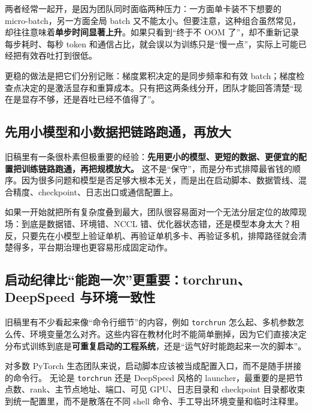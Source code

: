 两者经常一起开，是因为团队同时面临两种压力：一方面单卡装不下想要的 micro-batch，另一方面全局 batch 又不能太小。但要注意，这种组合虽然常见，却往往意味着\textbf{单步时间显著上升}。如果只看到“终于不 OOM 了”，却不重新记录每步耗时、每秒 token 和通信占比，就会误以为训练只是“慢一点”，实际上可能已经把有效吞吐打到很低。

更稳的做法是把它们分别记账：梯度累积决定的是同步频率和有效 batch；梯度检查点决定的是激活显存和重算成本。只有把这两条线分开，团队才能回答清楚“现在是显存不够，还是吞吐已经不值得了”。

\subsection{先用小模型和小数据把链路跑通，再放大}
旧稿里有一条很朴素但极重要的经验：\textbf{先用更小的模型、更短的数据、更便宜的配置把训练链路跑通，再把规模放大。} 这不是“保守”，而是分布式排障最省钱的顺序。因为很多问题和模型是否足够大根本无关，而是出在启动脚本、数据管线、混合精度、checkpoint、日志出口或通信配置上。

如果一开始就把所有复杂度叠到最大，团队很容易面对一个无法分层定位的故障现场：到底是数据错、环境错、NCCL 错、优化器状态错，还是模型本身太大？相反，只要先在小模型上验证单机、再验证单机多卡、再验证多机，排障路径就会清楚得多，平台期治理也更容易形成固定动作。

\subsection{启动纪律比“能跑一次”更重要：torchrun、DeepSpeed 与环境一致性}
旧稿里有不少看起来像“命令行细节”的内容，例如 \texttt{torchrun} 怎么起、多机参数怎么传、环境变量怎么对齐。这些内容在教材化时不能简单删掉，因为它们直接决定分布式训练到底是\textbf{可重复启动的工程系统}，还是“运气好时能跑起来一次的脚本”。

对多数 PyTorch 生态团队来说，{\heiti 启动脚本应该被当成配置入口，而不是随手拼接的命令行。} 无论是 \texttt{torchrun} 还是 DeepSpeed 风格的 launcher，最重要的是把节点数、rank、主节点地址、端口、可见 GPU、日志目录和 checkpoint 目录都收束到统一配置里，而不是散落在不同 shell 命令、手工导出环境变量和临时注释里。

